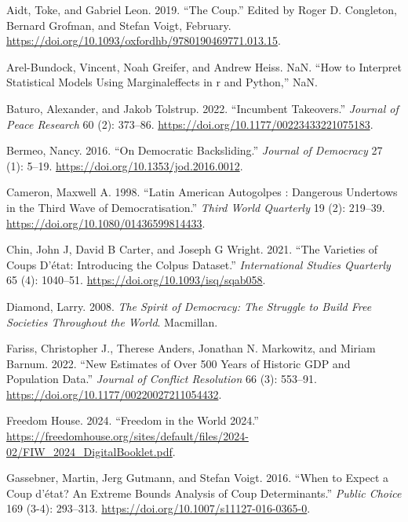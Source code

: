 \documentclass[
  12pt,
]{report}
\newlength{\cslhangindent}
\newenvironment{CSLReferences}[2] %
 {\begin{list}{}{%
  \setlength{\itemindent}{0pt}
  \setlength{\leftmargin}{0pt}
  \setlength{\parsep}{0pt}
  \ifodd #1
   \setlength{\leftmargin}{\cslhangindent}
   \setlength{\itemindent}{-1\cslhangindent}
  \fi
  \setlength{\itemsep}{#2\baselineskip}}}
 {\end{list}}
\begin{document}
\label{refs}
\begin{CSLReferences}{1}{0}
Aidt, Toke, and Gabriel Leon. 2019. {``The Coup.''} Edited by Roger D.
Congleton, Bernard Grofman, and Stefan Voigt, February.
\url{https://doi.org/10.1093/oxfordhb/9780190469771.013.15}.

Arel-Bundock, Vincent, Noah Greifer, and Andrew Heiss. NaN. {``How to
Interpret Statistical Models Using
{\textbraceleft}Marginaleffects{\textbraceright} in
{\textbraceleft}r{\textbraceright} and
{\textbraceleft}Python{\textbraceright},''} NaN.

Baturo, Alexander, and Jakob Tolstrup. 2022. {``Incumbent Takeovers.''}
\emph{Journal of Peace Research} 60 (2): 373--86.
\url{https://doi.org/10.1177/00223433221075183}.

Bermeo, Nancy. 2016. {``On Democratic Backsliding.''} \emph{Journal of
Democracy} 27 (1): 5--19. \url{https://doi.org/10.1353/jod.2016.0012}.

Cameron, Maxwell A. 1998. {``Latin American Autogolpes : Dangerous
Undertows in the Third Wave of Democratisation.''} \emph{Third World
Quarterly} 19 (2): 219--39.
\url{https://doi.org/10.1080/01436599814433}.

Chin, John J, David B Carter, and Joseph G Wright. 2021. {``The
Varieties of Coups D{'}état: Introducing the Colpus Dataset.''}
\emph{International Studies Quarterly} 65 (4): 1040--51.
\url{https://doi.org/10.1093/isq/sqab058}.

Diamond, Larry. 2008. \emph{The Spirit of Democracy: The Struggle to
Build Free Societies Throughout the World}. Macmillan.

Fariss, Christopher J., Therese Anders, Jonathan N. Markowitz, and
Miriam Barnum. 2022. {``New Estimates of Over 500 Years of Historic GDP
and Population Data.''} \emph{Journal of Conflict Resolution} 66 (3):
553--91. \url{https://doi.org/10.1177/00220027211054432}.

Freedom House. 2024. {``Freedom in the World 2024.''}
\url{https://freedomhouse.org/sites/default/files/2024-02/FIW_2024_DigitalBooklet.pdf}.

Gassebner, Martin, Jerg Gutmann, and Stefan Voigt. 2016. {``When to
Expect a Coup d{'}état? An Extreme Bounds Analysis of Coup
Determinants.''} \emph{Public Choice} 169 (3-4): 293--313.
\url{https://doi.org/10.1007/s11127-016-0365-0}.


\end{CSLReferences}
\end{document}
